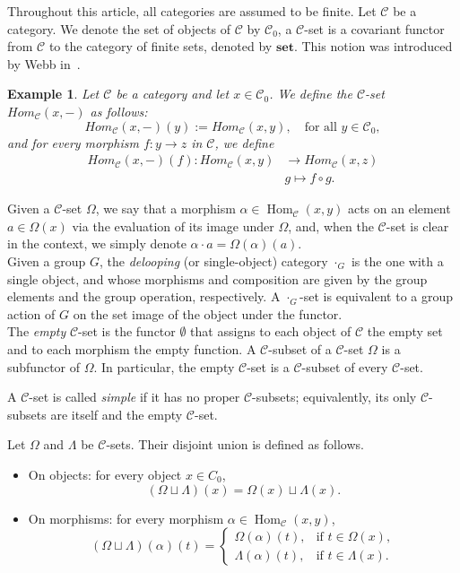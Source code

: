 \documentclass[a4paper]{article}
\newtheorem{exam}[thm]{Example}
\theoremstyle{definition}
\theoremstyle{remark}
\newcommand*{\cat}[1]{\mathcal{#1}}
\newcommand*{\obj}[1]{#1_0}
\newcommand*{\Hom}[3]{\operatorname{Hom}_{\cat{#1}} \left(#2, #3\right)}
\begin{document}
Throughout this article, all categories are assumed to be finite. Let $\cat{C}$ be a category. We denote the set of objects of $\cat{C}$ by $\cat{C}_0$, a $\cat{C}$-set is a covariant functor from $\cat{C}$ to the category of finite sets, denoted by $\mathbf{set}$. This notion was introduced by  Webb in~\cite{Webb23}.
\begin{exam}
Let $\cat{C}$ be a category and let $x \in \cat{C}_0$. We define the $\cat{C}$-set $Hom_{\cat{C}}(x,-)$ as follows:
\[
    Hom_{\cat{C}}(x,-)(y) := Hom_{\cat{C}}(x,y), \quad \text{for all } y \in \cat{C}_0,
\]
and for every morphism $f \colon y \to z$ in $\cat{C}$, we define
\begin{align*}
     Hom_{\cat{C}}(x,-)(f) \colon Hom_{\cat{C}}(x,y) &\to Hom_{\cat{C}}(x,z)\\
     &g \mapsto f \circ g.
\end{align*}

\end{exam}

Given a $\cat{C}$-set $\Omega$, we say that a morphism $\alpha \in \Hom{C}{x}{y}$ acts on an element $a \in \Omega(x)$ via the evaluation of its image under $\Omega$, and, when the $\cat{C}$-set is clear in the context, we simply denote $\alpha \cdot a = \Omega(\alpha)(a)$.\\

Given a group $G$, the \emph{delooping} (or single-object) category $\cdot_G$ is the one with a single object, and whose morphisms and composition are given by the group elements and the group operation, respectively. A $\cdot_G$-set is equivalent to a group action of $G$ on the set image of the object under the functor.\\

The \emph{empty} $\cat{C}$-set is the functor $\emptyset$ that assigns to each object of $\cat{C}$ the empty set and to each morphism the empty function. A $\cat{C}$-subset of a $\cat{C}$-set $\Omega$ is a subfunctor of $\Omega$. In particular, the empty $\cat{C}$-set is a $\cat{C}$-subset of every $\cat{C}$-set.

A $\cat{C}$-set is called \emph{simple} if it has no proper $\cat{C}$-subsets; equivalently, its only $\cat{C}$-subsets are itself and the empty $\cat{C}$-set.

Let $\Omega$ and $\Lambda$ be $\cat{C}$-sets. Their disjoint union is defined as follows.

\begin{itemize}
    \item On objects: for every object $x\in\obj{C}$,
    \[
    (\Omega\sqcup\Lambda)(x)=\Omega(x)\sqcup\Lambda(x).
    \]

    \item On morphisms: for every morphism $\alpha\in\Hom{C}{x}{y}$,
    \[
    (\Omega\sqcup\Lambda)(\alpha)(t)=
    \begin{cases}
        \Omega(\alpha)(t), & \text{if } t\in\Omega(x),\\
        \Lambda(\alpha)(t), & \text{if } t\in\Lambda(x).
    \end{cases}
    \]
\end{itemize}
\end{document}
